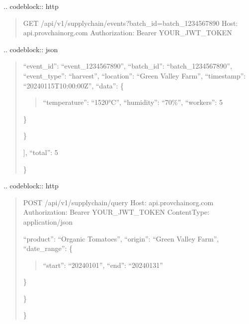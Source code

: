 \documentclass[letterpaper,10pt,english]{sphinxmanual}
\begin{document}
\sphinxAtStartPar
{}
.. code\sphinxhyphen{}block:: http
\begin{quote}

\sphinxAtStartPar
GET /api/v1/supply\sphinxhyphen{}chain/events?batch\_id=batch\_1234567890
Host: api.provchain\sphinxhyphen{}org.com
Authorization: Bearer YOUR\_JWT\_TOKEN
\end{quote}

\sphinxAtStartPar
{}
.. code\sphinxhyphen{}block:: json
\begin{quote}
\begin{description}
\sphinxlineitem{\{}\begin{description}
\sphinxlineitem{“events”: {[}}\begin{description}
\sphinxlineitem{\{}
\sphinxAtStartPar
“event\_id”: “event\_1234567890”,
“batch\_id”: “batch\_1234567890”,
“event\_type”: “harvest”,
“location”: “Green Valley Farm”,
“timestamp”: “2024\sphinxhyphen{}01\sphinxhyphen{}15T10:00:00Z”,
“data”: \{
\begin{quote}

\sphinxAtStartPar
“temperature”: “15\sphinxhyphen{}20°C”,
“humidity”: “70\%”,
“workers”: 5
\end{quote}

\sphinxAtStartPar
\}

\end{description}

\sphinxAtStartPar
\}

\end{description}

\sphinxAtStartPar
{]},
“total”: 5

\end{description}

\sphinxAtStartPar
\}
\end{quote}

\sphinxAtStartPar
{}
.. code\sphinxhyphen{}block:: http
\begin{quote}

\sphinxAtStartPar
POST /api/v1/supply\sphinxhyphen{}chain/query
Host: api.provchain\sphinxhyphen{}org.com
Authorization: Bearer YOUR\_JWT\_TOKEN
Content\sphinxhyphen{}Type: application/json
\begin{description}
\sphinxlineitem{\{}\begin{description}
\sphinxAtStartPar
“product”: “Organic Tomatoes”,
“origin”: “Green Valley Farm”,
“date\_range”: \{
\begin{quote}

\sphinxAtStartPar
“start”: “2024\sphinxhyphen{}01\sphinxhyphen{}01”,
“end”: “2024\sphinxhyphen{}01\sphinxhyphen{}31”
\end{quote}

\sphinxAtStartPar
\}

\end{description}

\sphinxAtStartPar
\}

\end{description}

\sphinxAtStartPar
\}
\end{quote}
\end{document}
